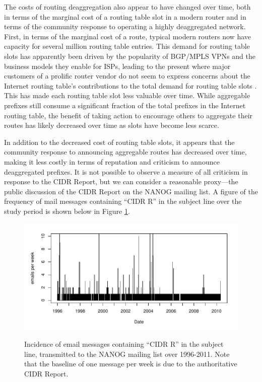 The costs of routing deaggregation also appear to have changed over time, both
in terms of the marginal cost of a routing table slot in a modern router and in
terms of the community response to operating a highly deaggregated network.
First, in terms of the marginal cost of a route, typical modern routers now
have capacity for several million routing table entries. This demand for
routing table slots has apparently been driven by the popularity of BGP/MPLS
VPNs \cite{rfc2547} and the business models they enable for ISPs, leading to
the present where major customers of a prolific router vendor do not seem to
express concerns about the Internet routing table's contributions to the total
demand for routing table slots \cite{Davie:2011uq}. This has made each routing
table slot less valuable over time. While aggregable prefixes still consume a
significant fraction of the total prefixes in the Internet routing table, the
benefit of taking action to encourage others to aggregate their routes has
likely decreased over time as slots have become less scarce.

In addition to the decreased cost of routing table slots, it appears that the
community response to announcing aggregable routes has decreased over time,
making it less costly in terms of reputation and criticism to announce
deaggregated prefixes. It is not possible to observe a measure of all
criticism in response to the CIDR Report, but we can consider a reasonable
proxy---the public discussion of the CIDR Report on the NANOG mailing list. A
figure of the frequency of mail messages containing ``CIDR R'' in the subject
line over the study period is shown below in Figure \ref{fig:mail-freq}.

\begin{figure}[h]
\begin{center}
    \includegraphics[width=6in]{figures/cr_email_freq.pdf}
    \vspace{-2em}\\
    \caption[Incidence of email messages containing ``CIDR R'' in the subject
    line]{Incidence of email messages containing ``CIDR R'' in the subject
    line, transmitted to the NANOG mailing list over 1996-2011. Note that the
    baseline of one message per week is due to the authoritative CIDR Report.}
    \label{fig:mail-freq}
\end{center}
\end{figure}

